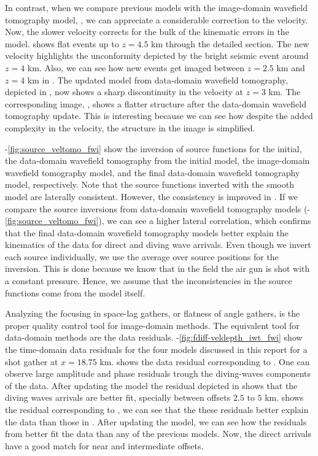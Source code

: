 In contrast, when we compare previous models with the image-domain wavefield 
tomography model, , we can appreciate a considerable correction
 to the velocity. Now, the slower velocity corrects for the bulk of the kinematic
errors in the model.  shows flat events up 
to $z=4.5$ km through the detailed section. The new velocity highlights the 
 unconformity depicted by the bright seismic event around $z=4$ km. Also, we can see
how new events get imaged between $z=2.5$ km and $z=4$ km in . 
 The updated model from data-domain wavefield tomography, depicted in , 
now shows a sharp discontinuity in the velocity at $z=3$ km. The corresponding
 image, , shows a flatter structure 
after the data-domain wavefield tomography update. This is interesting because we can see how despite the 
added complexity in the velocity, the structure in the image is simplified.

-\ref{fig:source_veltomo_fwi} show the inversion of
source functions for the initial, the data-domain wavefield tomography from the initial model, the image-domain wavefield tomography model, and 
the final data-domain wavefield tomography model, respectively. Note that the source functions inverted
with the smooth model are laterally consistent. However, the consistency is improved
 in . If we compare the source inversions from data-domain wavefield tomography models 
(-\ref{fig:source_veltomo_fwi}), we can see 
a higher lateral correlation, which confirms that the final data-domain wavefield tomography models 
better explain the kinematics of the data for direct and diving wave arrivals. 
Even though we invert each source individually, we use the average over source positions for the inversion.
 This is done because we know that in the field the air gun is shot with a constant pressure. Hence, 
we assume that the inconsistencies
 in the source functions come from the model itself. 

Analyzing the focusing in space-lag gathers, or flatness of angle gathers, is the proper quality control tool for 
image-domain methods. The equivalent tool for data-domain methods are the data residuals.
 -\ref{fig:fdiff-veldepth_iwt_fwi} show the time-domain data residuals for the four models
discussed in this report for a shot gather at $x=18.75$ km.  shows the data residual 
corresponding to . One can observe large amplitude and phase residuals trough the diving-waves 
components of the data. After updating the model the residual depicted in  shows
that the diving waves arrivals are better fit, specially between offsets $2.5\text{ to }5$ km. 
  shows the residual corresponding to , we can see that 
the these residuals better explain the data than those in . After updating the model,
  we can see how the residuals from  better
fit the data than any of the previous models. Now, the direct arrivals have a good match for near
and intermediate offsets.


